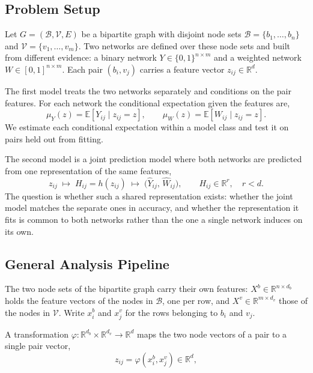\subsection{Problem Setup}

Let \(G=(\mathcal{B},\mathcal{V},E)\) be a bipartite graph with disjoint node sets
\(\mathcal{B}=\{b_1,\ldots,b_n\}\) and \(\mathcal{V}=\{v_1,\ldots,v_m\}\). Two networks are defined over
these node sets and built from different evidence: a binary network \(Y\in\{0,1\}^{n\times m}\) and a
weighted network \(W\in[0,1]^{n\times m}\). Each pair \((b_i,v_j)\) carries a feature vector
\(z_{ij}\in\mathbb{R}^{d}\).

The first model treats the two networks separately and conditions on the pair features. For each
network the conditional expectation given the features are,
\begin{equation}\label{eq:condmodels}
 \mu_{Y}(z)=\mathbb{E}\!\left[Y_{ij}\mid z_{ij}=z\right],
 \qquad
 \mu_{W}(z)=\mathbb{E}\!\left[W_{ij}\mid z_{ij}=z\right].
\end{equation}
We estimate each conditional expectation within a model class and test it on pairs held out from
fitting.

The second model is a joint prediction model where both networks are predicted from one representation of the same features,
\begin{equation}\label{eq:jointmodel}
 z_{ij}\;\longmapsto\;H_{ij}=h(z_{ij})\;\longmapsto\;\bigl(\widehat Y_{ij},\,\widehat W_{ij}\bigr),
 \qquad H_{ij}\in\mathbb{R}^{r},\quad r<d.
\end{equation}
The question is whether such a shared representation exists: whether the joint model matches the
separate ones in accuracy, and whether the representation it fits is common to both networks rather
than the one a single network induces on its own.

\subsection{General Analysis Pipeline}
\label{sec:pipeline}

The two node sets of the bipartite graph carry their own features:
\(X^{b}\in\mathbb{R}^{n\times d_b}\) holds the feature vectors of the nodes in \(\mathcal{B}\), one per
row, and \(X^{v}\in\mathbb{R}^{m\times d_v}\) those of the nodes in \(\mathcal{V}\). Write \(x^{b}_{i}\)
and \(x^{v}_{j}\) for the rows belonging to \(b_i\) and \(v_j\).

A transformation \(\varphi:\mathbb{R}^{d_b}\times\mathbb{R}^{d_v}\to\mathbb{R}^{d}\) maps the two node
vectors of a pair to a single pair vector,
\begin{equation}\label{eq:pairfeature}
 z_{ij}=\varphi\!\left(x^{b}_{i},x^{v}_{j}\right)\in\mathbb{R}^{d},
\end{equation}

